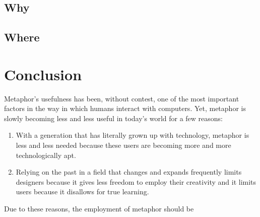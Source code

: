 \documentclass[11pt, oneside]{article}   	%
\begin{document}
\subsection{Why}
\subsection{Where}


\section{Conclusion}
Metaphor's usefulness has been, without contest, one of the most important factors in the way in which humans interact with computers. Yet, metaphor is slowly becoming less and less useful in today's world for a few reasons:
\begin{enumerate}
\item With a generation that has literally grown up with technology, metaphor is less and less needed because these users are becoming more and more technologically apt.
\item Relying on the past in a field that changes and expands frequently limits designers because it gives less freedom to employ their creativity and it limits users because it disallows for true learning.
\end{enumerate}
Due to these reasons, the employment of metaphor should be 

\pagebreak


\end{document}
